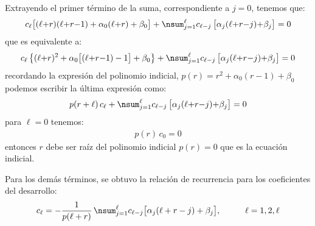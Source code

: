 Extrayendo el primer término de la suma, correspondiente a $j = 0$, tenemos que:
\begin{align*}
c_{\ell} \big[ (\ell {+} r)(\ell {+} r {-} 1) + \alpha_{0} (\ell {+} r) + \beta_{0} \big] + \nsum_{j=1}^{\ell} c_{\ell-j} \, \big[ \alpha_{j} (\ell {+} r {-} j) {+} \beta_{j} \big] = 0
\end{align*}
que es equivalente a:
\begin{align*}
c_{\ell} \left\{ (\ell {+} r)^{2} + \alpha_{0} \big[ (\ell {+} r {-} 1) - 1 \big] + \beta_{0} \right\} + \nsum_{j=1}^{\ell} c_{\ell-j} \, \big[ \alpha_{j} (\ell {+} r {-} j) {+} \beta_{j} \big] = 0
\end{align*}
recordando la expresión del polinomio indicial, $p (r) = r^{2} + \alpha_{0} (r - 1) + \beta_{0}$ podemos escribir la última expresión como:
\begin{align*}
p (r + \ell) \, c_{\ell} + \nsum_{j=1}^{\ell} c_{\ell-j} \, \big[ \alpha_{j} (\ell {+} r {-} j) {+} \beta_{j} \big] = 0
\end{align*}
para $\ell = 0$ tenemos:
\begin{align*}
p (r) \, c_{0} = 0
\end{align*}
entonces $r$ debe ser raíz del polinomio indicial $p (r) = 0$ que es la ecuación indicial.
\par
Para los demás términos, se obtuvo la relación de recurrencia para los coeficientes del desarrollo:
\begin{align*}
c_{\ell} = - \dfrac{1}{p (\ell + r)} \, \nsum_{j=1}^{\ell} c_{\ell-j} \big[ \alpha_{j} (\ell + r - j) + \beta_{j} \big], \hspace{1cm} \ell = 1, 2, \ell
\end{align*}

